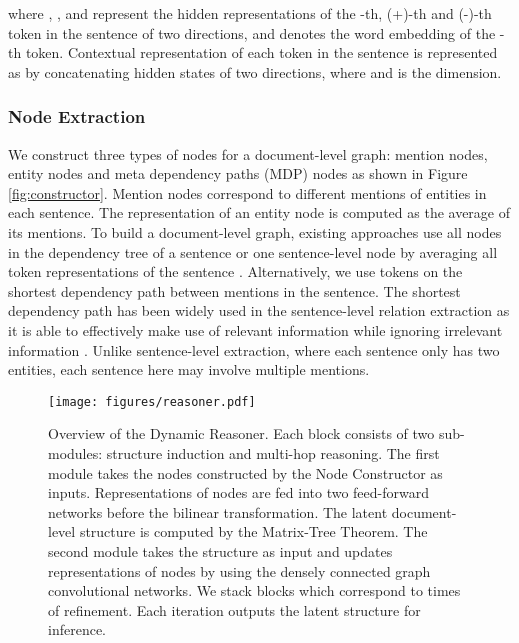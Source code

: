 \documentclass[11pt,a4paper]{article}
\begin{document}
where , ,    and  represent the hidden representations of the -th, (+)-th and (-)-th token in the sentence  of two directions, and  denotes the word embedding of the -th token. Contextual representation of each token in the sentence is represented as  by concatenating hidden states of two directions, where  and  is the dimension.

\subsubsection{Node Extraction}
\label{ssec:3.1.2}
We construct three types of nodes for a document-level graph: mention nodes, entity nodes and meta dependency paths (MDP) nodes as shown in Figure \ref{fig:constructor}. Mention nodes correspond to different mentions of entities in each sentence. The representation of an entity node is computed as the average of its mentions. To build a document-level graph, existing approaches use all nodes in the dependency tree of a sentence \citep{Sahu2019IntersentenceRE} or one sentence-level node by averaging all token representations of the sentence \citep{christopoulou2019connecting}. Alternatively, we use tokens on the shortest dependency path between mentions in the sentence. The shortest dependency path has been widely used in the sentence-level relation extraction as it is able to effectively make use of relevant information while ignoring irrelevant information \citep{Bunescu2005ASP, Xu2015SemanticRC, Xu2015ClassifyingRV}. Unlike sentence-level extraction, where each sentence only has two entities, each sentence here may involve multiple mentions. 

\begin{figure}[!htb]
\centering
\texttt{[image: figures/reasoner.pdf]}
\vspace{-1mm}
\caption{Overview of the Dynamic Reasoner. Each block consists of two sub-modules: structure induction and multi-hop reasoning. The first module takes the nodes constructed by the Node Constructor as inputs. Representations of nodes are fed into two feed-forward networks before the bilinear transformation. The latent document-level structure is computed by the Matrix-Tree Theorem. The second module takes the structure as input and updates representations of nodes by using the densely connected graph convolutional networks. We stack  blocks which correspond to  times of refinement. Each iteration outputs the latent structure for inference.}
\vspace{-4mm}
\label{fig:reasoner}
\end{figure}
\end{document}
